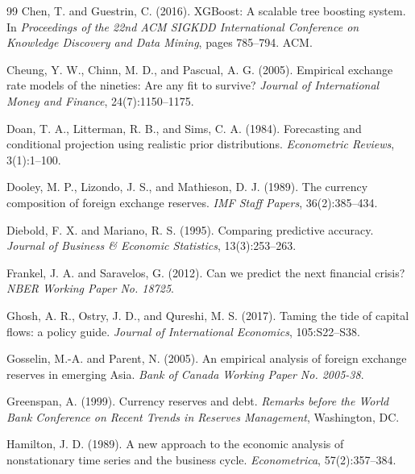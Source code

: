 \documentclass[12pt,a4paper]{article}
\begin{document}
\begin{thebibliography}{99}
Chen, T. and Guestrin, C. (2016).
\newblock XGBoost: A scalable tree boosting system.
\newblock In \textit{Proceedings of the 22nd ACM SIGKDD International Conference on Knowledge Discovery and Data Mining}, pages 785--794. ACM.

Cheung, Y. W., Chinn, M. D., and Pascual, A. G. (2005).
\newblock Empirical exchange rate models of the nineties: Are any fit to survive?
\newblock \textit{Journal of International Money and Finance}, 24(7):1150--1175.

Doan, T. A., Litterman, R. B., and Sims, C. A. (1984).
\newblock Forecasting and conditional projection using realistic prior distributions.
\newblock \textit{Econometric Reviews}, 3(1):1--100.

Dooley, M. P., Lizondo, J. S., and Mathieson, D. J. (1989).
\newblock The currency composition of foreign exchange reserves.
\newblock \textit{IMF Staff Papers}, 36(2):385--434.

Diebold, F. X. and Mariano, R. S. (1995).
\newblock Comparing predictive accuracy.
\newblock \textit{Journal of Business \& Economic Statistics}, 13(3):253--263.

Frankel, J. A. and Saravelos, G. (2012).
\newblock Can we predict the next financial crisis?
\newblock \textit{NBER Working Paper No. 18725}.

Ghosh, A. R., Ostry, J. D., and Qureshi, M. S. (2017).
\newblock Taming the tide of capital flows: a policy guide.
\newblock \textit{Journal of International Economics}, 105:S22--S38.

Gosselin, M.-A. and Parent, N. (2005).
\newblock An empirical analysis of foreign exchange reserves in emerging Asia.
\newblock \textit{Bank of Canada Working Paper No. 2005-38}.

Greenspan, A. (1999).
\newblock Currency reserves and debt.
\newblock \textit{Remarks before the World Bank Conference on Recent Trends in Reserves Management}, Washington, DC.

Hamilton, J. D. (1989).
\newblock A new approach to the economic analysis of nonstationary time series and the business cycle.
\newblock \textit{Econometrica}, 57(2):357--384.


\end{thebibliography}
\end{document}
